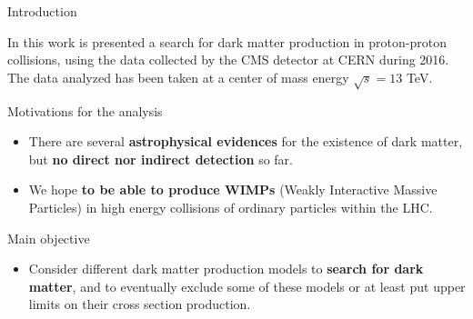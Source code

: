 \documentclass[8 pt]{beamer}
\begin{document}
\begin{frame}{Introduction}


	\justifying
 	In this work is presented a search for dark matter production in proton-proton collisions, using the data collected by the CMS detector at CERN during 2016. The data analyzed has been taken at a center of mass energy $\sqrt{s} = 13$ TeV. \vfill %



	\begin{exampleblock}{} Motivations for the analysis \end{exampleblock}
	
	\begin{itemize}
	\justifying
	\item There are several \textbf{astrophysical evidences} for the existence of dark matter, but \textbf{no direct nor indirect detection} so far. \vfill
	\item We hope \textbf{to be able to produce WIMPs} (Weakly Interactive Massive Particles) in high energy collisions of ordinary particles within the LHC. \vfill %
	\end{itemize}


	\begin{exampleblock}{} Main objective \end{exampleblock}
	
	\begin{itemize}
	\justifying
	\item Consider different dark matter production models to \textbf{search for dark matter}, and to eventually exclude some of these models or at least put upper limits on their cross section production. \vfill
	\end{itemize}

\end{frame}
\end{document}
